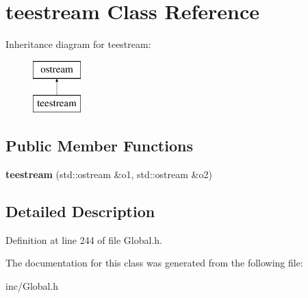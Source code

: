 \hypertarget{classteestream}{\section{teestream Class Reference}
\label{classteestream}
}
Inheritance diagram for teestream\-:\begin{figure}[H]
\begin{center}
\leavevmode
\includegraphics[height=2.000000cm]{classteestream}
\end{center}
\end{figure}
\subsection*{Public Member Functions}
\begin{DoxyCompactItemize}
\item 
\hypertarget{classteestream_aa7289fc026f510120ce669da5ad6b92e}{{\bfseries teestream} (std\-::ostream \&o1, std\-::ostream \&o2)}\label{classteestream_aa7289fc026f510120ce669da5ad6b92e}

\end{DoxyCompactItemize}


\subsection{Detailed Description}


Definition at line 244 of file Global.\-h.



The documentation for this class was generated from the following file\-:\begin{DoxyCompactItemize}
\item 
inc/Global.\-h\end{DoxyCompactItemize}
